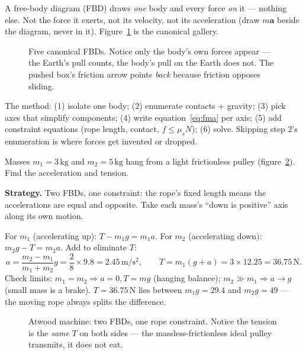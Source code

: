 A free-body diagram (FBD) draws \emph{one} body and
every force \emph{on} it --- nothing else. Not the force it exerts, not its
velocity, not its acceleration (draw $m\mathbf a$ beside the diagram, never
in it). Figure~\ref{fig:fbdgal} is the canonical gallery.

\begin{figure}[htbp]\centering

\caption{Five canonical FBDs. Notice only the body's own forces appear ---
the Earth's pull counts, the body's pull on the Earth does not. The pushed
box's friction arrow points \emph{back} because friction opposes sliding.}
\label{fig:fbdgal}
\end{figure}

The method: (1) isolate one body; (2) enumerate contacts + gravity; (3) pick
axes that simplify components; (4) write equation~\eqref{eq:fma} per axis;
(5) add constraint equations (rope length, contact, $f\le\mu_sN$); (6) solve.
Skipping step 2's enumeration is where forces get invented or dropped.

\begin{example}\label{ex:atwood}
Masses $m_1=3\,\mathrm{kg}$ and $m_2=5\,\mathrm{kg}$ hang from a light
frictionless pulley (figure~\ref{fig:atwood}). Find the acceleration and
tension.
\par\smallskip
\textbf{Strategy.} Two FBDs, one constraint: the rope's fixed length means
the accelerations are equal and opposite. Take each mass's ``down is
positive'' axis along its own motion.
\begin{solution}
For $m_1$ (accelerating up): $T-m_1g=m_1a$.
For $m_2$ (accelerating down): $m_2g-T=m_2a$.
Add to eliminate $T$:
\[
  a=\frac{m_2-m_1}{m_1+m_2}g=\frac{2}{8}\times9.8=2.45\,\mathrm{m/s^{2}},
  \qquad
  T=m_1(g+a)=3\times12.25=36.75\,\mathrm{N}.
\]
Check limits: $m_1=m_2\Rightarrow a=0,T=mg$ (hanging balance);
$m_2\gg m_1\Rightarrow a\to g$ (small mass is a brake). $T=36.75$\,N lies
between $m_1g=29.4$ and $m_2g=49$ --- the moving rope always splits the
difference. \checkmark
\end{solution}
\end{example}

\begin{figure}[htbp]\centering

\caption{Atwood machine: two FBDs, one rope constraint. Notice the tension
is the \emph{same} $T$ on both sides --- the massless-frictionless ideal
pulley transmits, it does not eat.}
\label{fig:atwood}
\end{figure}

